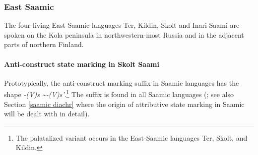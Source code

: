 \subsubsection{East Saamic}
The four living East Saamic languages Ter, Kildin, Skolt and Inari Saami are spoken on the Kola peninsula in northwestern-most Russia and in the adjacent parts of northern Finland.

\paragraph{Anti-construct state marking in Skolt Saami}%
Prototypically, the anti-construct marking suffix in Saamic languages has the shape \textit{-(V)s \textasciitilde-(V)s'}.\footnote{The palatalized variant occurs in the East-Saamic languages Ter, Skolt, and Kildin.} The suffix is found in all Saamic languages (\citealt{riesler2006b}; see also Section \ref{saamic diachr} where the origin of attributive state marking in Saamic will be dealt with in detail). 

